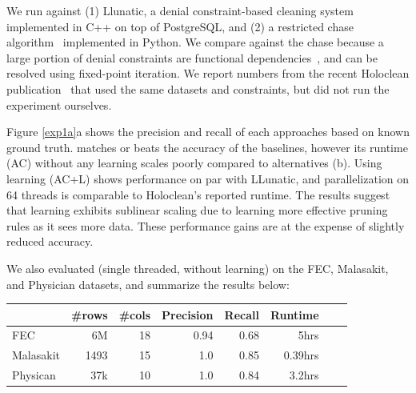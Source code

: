 
 We run against (1) Llunatic, a denial constraint-based cleaning system~\cite{DBLP:conf/sigmod/DallachiesaEEEIOT13} implemented in C++ on top of PostgreSQL, and (2) a restricted chase algorithm~\cite{benedikt2017benchmarking} implemented in Python. We compare against the chase because a large portion of denial constraints are functional dependencies~\cite{}, and can be resolved using fixed-point iteration.  We report numbers from the recent Holoclean publication~\cite{rekatsinas2017holoclean} that used the same datasets and constraints, but did not run the experiment ourselves.

 Figure \ref{exp1a}a shows the precision and recall of each approaches based on known ground truth. \sys matches or beats the accuracy of the baselines, however its runtime (AC) without any learning scales poorly compared to alternatives (b).  Using learning (AC+L) shows performance on par with LLunatic, and parallelization on 64 threads is comparable to Holoclean's reported runtime. The results suggest that learning exhibits sublinear scaling due to \sys learning more effective pruning rules as it sees more data.  These performance gains are at the expense of slightly reduced accuracy. 

We also evaluated \sys (single threaded, without learning) on the FEC, Malasakit, and Physician datasets, and summarize the results below:
\begin{table}[ht]
\footnotesize
\small
\centering
\begin{tabular}{|l|r|r|r|r|r|r|r|}
\hline
 & \#rows & \#cols & Precision & Recall & Runtime \\
\hline
\hline
FEC	&6M&18&0.94&	0.68&	5hrs\\
\hline
Malasakit &1493& 15& 1.0 & 0.85& 0.39hrs\\
\hline
Physican	&37k&10&1.0&0.84& 3.2hrs\\
\hline
\end{tabular}
\end{table}


